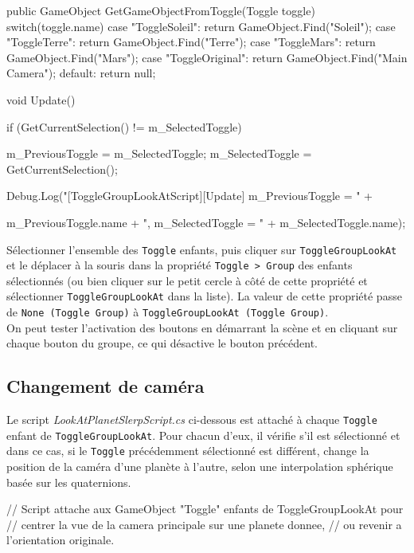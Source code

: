 \documentclass[a4paper,10pt]{article}
\newenvironment{solution}%
{\begin{tcolorbox}[breakable,colback=red!5!white,colframe=red!75!black,title=Solution]}%
{\end{tcolorbox}}
\newenvironment{boxcode}%
{\begin{tcolorbox}[breakable,colback=gray!5!white,colframe=black]}%
	{\end{tcolorbox}}
\begin{document}
\begin{solution}
\begin{boxcode}
\begin{csharpsansbord}
{  public GameObject GetGameObjectFromToggle(Toggle toggle) {
	switch(toggle.name) {
		case "ToggleSoleil":
			return GameObject.Find("Soleil");
		case "ToggleTerre":
			return GameObject.Find("Terre");
		case "ToggleMars":
			return GameObject.Find("Mars");
		case "ToggleOriginal":
			return GameObject.Find("Main Camera");
		default:
			return null;
	}
  }

  void Update() {
	if (GetCurrentSelection() != m_SelectedToggle) {
		m_PreviousToggle = m_SelectedToggle;
		m_SelectedToggle = GetCurrentSelection();

		Debug.Log("[ToggleGroupLookAtScript][Update] m_PreviousToggle = " +

		m_PreviousToggle.name + ", m_SelectedToggle = " +
		m_SelectedToggle.name);
	}
  }
}
\end{csharpsansbord}
\end{boxcode}

Sélectionner l'ensemble des \texttt{Toggle} enfants, puis cliquer sur \texttt{ToggleGroupLookAt} et le déplacer à la souris dans la propriété \texttt{Toggle > Group} des enfants sélectionnés (ou bien cliquer sur le petit cercle à côté de cette propriété et sélectionner \texttt{ToggleGroupLookAt} dans la liste). La valeur de cette propriété passe de \texttt{None (Toggle Group)} à \texttt{ToggleGroupLookAt (Toggle Group)}.\\

On peut tester l'activation des boutons en démarrant la scène et en cliquant sur chaque bouton du groupe, ce qui désactive le bouton précédent.

\subsection{Changement de caméra}

Le script \textit{LookAtPlanetSlerpScript.cs} ci-dessous est attaché à chaque \texttt{Toggle} enfant de \texttt{ToggleGroupLookAt}. Pour chacun d'eux, il vérifie s'il est sélectionné et dans ce cas,  si le \texttt{Toggle} précédemment sélectionné est différent, change la position de la caméra d'une planète à l'autre, selon une interpolation sphérique basée sur les quaternions.

\begin{boxcode}
	\begin{csharpsansbord}
// Script attache aux GameObject "Toggle" enfants de ToggleGroupLookAt pour
//  centrer la vue de la camera principale sur une planete donnee, 
// ou revenir a l'orientation originale.


\end{csharpsansbord}
\end{boxcode}
\end{solution}
\end{document}
